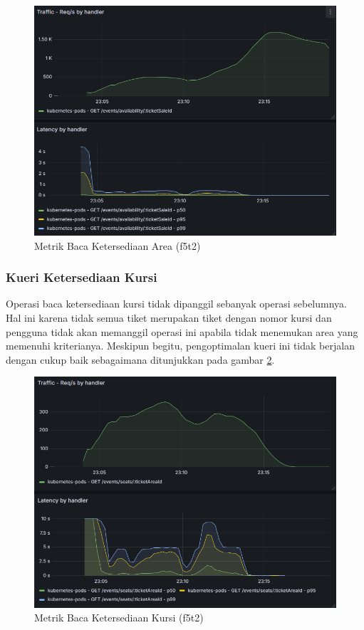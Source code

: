 \begin{figure}[htbp]
    \centering
    \includegraphics[width=1\textwidth]{resources/chapter-4/latency-area-availability.png}
    \caption{Metrik Baca Ketersediaan Area (f5t2)}
    \label{fig:latency-get-area}
\end{figure}

\subsubsection{Kueri Ketersediaan Kursi}

Operasi baca ketersediaan kursi tidak dipanggil sebanyak operasi sebelumnya. Hal ini karena tidak semua tiket merupakan tiket dengan nomor kursi dan pengguna tidak akan memanggil operasi ini apabila tidak menemukan area yang memenuhi kriterianya. Meskipun begitu, pengoptimalan kueri ini tidak berjalan dengan cukup baik sebagaimana ditunjukkan pada gambar \ref{fig:latency-get-seat}.

\pagebreak

\begin{figure}[htbp]
    \centering
    \includegraphics[width=1\textwidth]{resources/chapter-4/latency-seat-availability.png}
    \caption{Metrik Baca Ketersediaan Kursi (f5t2)}
    \label{fig:latency-get-seat}
\end{figure}

